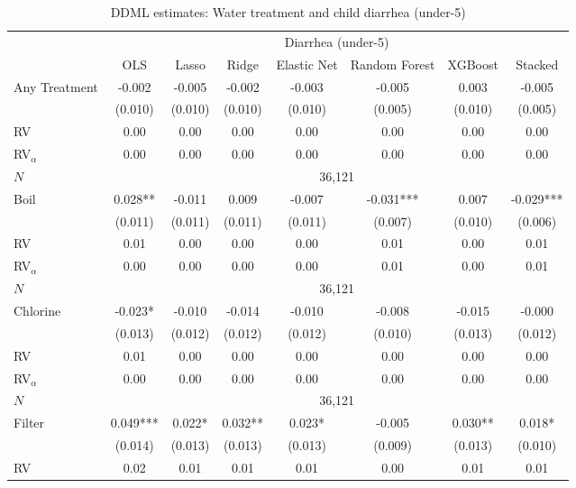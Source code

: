 \begin{table}[htbp]
\centering
\caption{DDML estimates: Water treatment and child diarrhea (under-5)}
\label{tab:results-diarrhea}
\scriptsize
\setlength{\tabcolsep}{3pt}
\renewcommand{\arraystretch}{0.94}
\begin{adjustbox}{max width=\linewidth, max totalheight=0.86\textheight, center}
\begin{tabular}{l|ccccccc}
\toprule
 & \multicolumn{7}{c}{Diarrhea (under-5)} \\
\cmidrule(lr){2-8}
 & OLS & Lasso & Ridge & Elastic Net & Random Forest & XGBoost & Stacked \\
\midrule
Any Treatment & -0.002 & -0.005 & -0.002 & -0.003 & -0.005 & 0.003 & -0.005 \\
 & (0.010) & (0.010) & (0.010) & (0.010) & (0.005) & (0.010) & (0.005) \\
\quad RV & 0.00 & 0.00 & 0.00 & 0.00 & 0.00 & 0.00 & 0.00 \\
\quad RV$_\alpha$ & 0.00 & 0.00 & 0.00 & 0.00 & 0.00 & 0.00 & 0.00 \\
\quad $N$ & \multicolumn{7}{c}{36,121} \\
\midrule
Boil & 0.028** & -0.011 & 0.009 & -0.007 & -0.031*** & 0.007 & -0.029*** \\
 & (0.011) & (0.011) & (0.011) & (0.011) & (0.007) & (0.010) & (0.006) \\
\quad RV & 0.01 & 0.00 & 0.00 & 0.00 & 0.01 & 0.00 & 0.01 \\
\quad RV$_\alpha$ & 0.00 & 0.00 & 0.00 & 0.00 & 0.01 & 0.00 & 0.01 \\
\quad $N$ & \multicolumn{7}{c}{36,121} \\
\midrule
Chlorine & -0.023* & -0.010 & -0.014 & -0.010 & -0.008 & -0.015 & -0.000 \\
 & (0.013) & (0.012) & (0.012) & (0.012) & (0.010) & (0.013) & (0.012) \\
\quad RV & 0.01 & 0.00 & 0.00 & 0.00 & 0.00 & 0.00 & 0.00 \\
\quad RV$_\alpha$ & 0.00 & 0.00 & 0.00 & 0.00 & 0.00 & 0.00 & 0.00 \\
\quad $N$ & \multicolumn{7}{c}{36,121} \\
\midrule
Filter & 0.049*** & 0.022* & 0.032** & 0.023* & -0.005 & 0.030** & 0.018* \\
 & (0.014) & (0.013) & (0.013) & (0.013) & (0.009) & (0.013) & (0.010) \\
\quad RV & 0.02 & 0.01 & 0.01 & 0.01 & 0.00 & 0.01 & 0.01 \\

\end{tabular}
\end{adjustbox}
\end{table}
